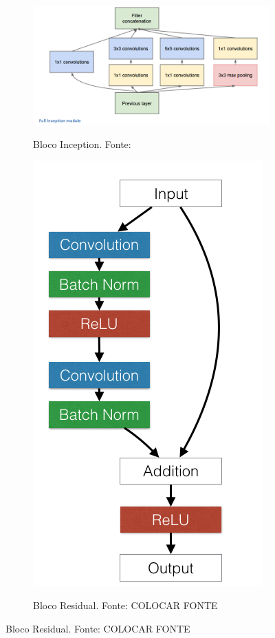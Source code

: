 \begin{figure}
	\begin{subfigure}[h]{0.5\linewidth}
		\centering
		\caption{Bloco Inception. Fonte: \cite{9dlpapers}}
		\includegraphics[width=0.7\linewidth]{img/GoogLeNet}
		\label{fig:bloco_inception}
	\end{subfigure}
	\begin{subfigure}[h]{0.5\linewidth}
		\centering
		\caption{Bloco Residual. Fonte: COLOCAR FONTE}
		\includegraphics[width=0.7\linewidth]{img/resnets_modelvariants}
		\label{fig:bloco_residual}
	\end{subfigure} %
\end{figure}

